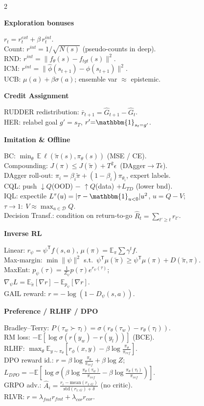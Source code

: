 \documentclass[a4paper]{article}
\newcommand{\hd}[1]{%
  \par\addvspace{3.6pt}%
  {\color{accent}\bfseries\small #1}\par
  \vspace{-4pt}{\color{accent!45}\rule{\linewidth}{0.4pt}}\par\vspace{1.2pt}}
\newcommand{\E}{\mathbb{E}}
\newcommand{\grad}{\nabla}
\newcommand{\T}{^{\mathsf{T}}}
\newcommand{\norm}[1]{\lVert #1 \rVert}
\newcommand{\dataset}{\mathcal{D}}
\newcommand{\ind}{\mathbbm{1}}
\begin{document}
\begin{multicols}{2}
\hd{Exploration bonuses}
$r_t=r_t^{ext}+\beta\,r_t^{int}$.\\
Count: $r^{int}=1/\sqrt{N(s)}$ (pseudo-counts in deep).\\
RND: $r^{int}=\norm{f_\theta(s)-f_{tgt}(s)}^2$.\\
ICM: $r^{int}=\norm{\hat\phi(s_{t+1})-\phi(s_{t+1})}^2$.\\
UCB: $\mu(a)+\beta\sigma(a)$; ensemble var $\approx$ epistemic.

\hd{Credit Assignment}
RUDDER redistribution: $\bar r_{t+1}=\hat G_{t+1}-\hat G_t$.\\
HER: relabel goal $g'{=}s_T$, $r'{=}\ind_{s_t=g'}$.

\hd{Imitation \& Offline}
BC: $\min_\theta\,\E\,\ell(\tilde\pi(s),\pi_\theta(s))$ (MSE / CE).\\
Compounding: $J(\pi)\le J(\tilde\pi)+T^2\epsilon$ \,(DAgger$\to T\epsilon$).\\
DAgger roll-out: $\pi_i=\beta_i\tilde\pi+(1{-}\beta_i)\pi_{\theta_i}$, expert labels.\\
CQL: push $\downarrow Q$(OOD) $-$ $\uparrow Q$(data) $+L_{TD}$ (lower bnd).\\
IQL: expectile $L^\tau(u)=|\tau-\ind_{u<0}|u^2$, $u{=}Q{-}V$; $\tau{\to}1{:}\ V{\approx}\max_{a\in\dataset}Q$.\\
Decision Transf.: condition on return-to-go $\hat R_t=\sum_{t'\ge t}r_{t'}$.

\hd{Inverse RL}
Linear: $r_\psi=\psi\T f(s,a)$, $\mu(\pi)=\E_\pi\sum\gamma^t f$.\\
Max-margin: $\min\norm{\psi}^2$ s.t.\ $\psi\T\mu(\tilde\pi)\ge\psi\T\mu(\pi)+D(\tilde\pi,\pi)$.\\
MaxEnt: $p_\psi(\tau)=\frac1{Z_\psi}p(\tau)e^{r_\psi(\tau)}$;\\
$\grad_\psi L=\E_{\tilde\pi}[\grad r]-\E_{p_\psi}[\grad r]$.\\
GAIL reward: $r=-\log(1-D_\psi(s,a))$.

\hd{Preference / RLHF / DPO}
Bradley--Terry: $P(\tau_w{\succ}\tau_l)=\sigma(r_\theta(\tau_w)-r_\theta(\tau_l))$.\\
RM loss: $-\E[\log\sigma(r(y_w)-r(y_l))]$ (BCE).\\
RLHF: $\max_\theta\E_{y\sim\pi_\theta}[r_\phi(x,y)-\beta\log\frac{\pi_\theta}{\pi_{ref}}]$.\\
DPO reward id.: $r=\beta\log\frac{\pi_\theta}{\pi_{ref}}+\beta\log Z$;\\
$L_{DPO}=-\E[\log\sigma(\beta\log\frac{\pi_\theta(\tau_w)}{\pi_{ref}}-\beta\log\frac{\pi_\theta(\tau_l)}{\pi_{ref}})]$.\\
GRPO adv.: $\hat A_i=\frac{r_i-\mathrm{mean}(r_{1:G})}{\mathrm{std}(r_{1:G})+\delta}$ (no critic).\\
RLVR: $r=\lambda_{fmt}r_{fmt}+\lambda_{cor}r_{cor}$.


\end{multicols}
\end{document}
